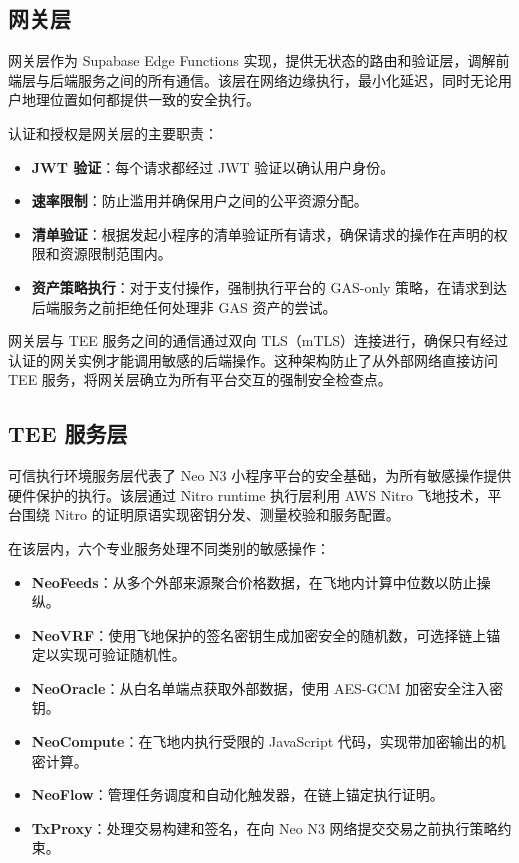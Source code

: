 \documentclass[11pt,a4paper]{article}
\begin{document}
\subsection{网关层}

网关层作为 Supabase Edge Functions 实现，提供无状态的路由和验证层，调解前端层与后端服务之间的所有通信。该层在网络边缘执行，最小化延迟，同时无论用户地理位置如何都提供一致的安全执行。

认证和授权是网关层的主要职责：

\begin{itemize}
    \item \textbf{JWT 验证}：每个请求都经过 JWT 验证以确认用户身份。
    \item \textbf{速率限制}：防止滥用并确保用户之间的公平资源分配。
    \item \textbf{清单验证}：根据发起小程序的清单验证所有请求，确保请求的操作在声明的权限和资源限制范围内。
    \item \textbf{资产策略执行}：对于支付操作，强制执行平台的 GAS-only 策略，在请求到达后端服务之前拒绝任何处理非 GAS 资产的尝试。
\end{itemize}

网关层与 TEE 服务之间的通信通过双向 TLS（mTLS）连接进行，确保只有经过认证的网关实例才能调用敏感的后端操作。这种架构防止了从外部网络直接访问 TEE 服务，将网关层确立为所有平台交互的强制安全检查点。

\subsection{TEE 服务层}

可信执行环境服务层代表了 Neo N3 小程序平台的安全基础，为所有敏感操作提供硬件保护的执行。该层通过 Nitro runtime 执行层利用 AWS Nitro 飞地技术，平台围绕 Nitro 的证明原语实现密钥分发、测量校验和服务配置。

在该层内，六个专业服务处理不同类别的敏感操作：

\begin{itemize}
    \item \textbf{NeoFeeds}：从多个外部来源聚合价格数据，在飞地内计算中位数以防止操纵。
    \item \textbf{NeoVRF}：使用飞地保护的签名密钥生成加密安全的随机数，可选择链上锚定以实现可验证随机性。
    \item \textbf{NeoOracle}：从白名单端点获取外部数据，使用 AES-GCM 加密安全注入密钥。
    \item \textbf{NeoCompute}：在飞地内执行受限的 JavaScript 代码，实现带加密输出的机密计算。
    \item \textbf{NeoFlow}：管理任务调度和自动化触发器，在链上锚定执行证明。
    \item \textbf{TxProxy}：处理交易构建和签名，在向 Neo N3 网络提交交易之前执行策略约束。
\end{itemize}
\end{document}
